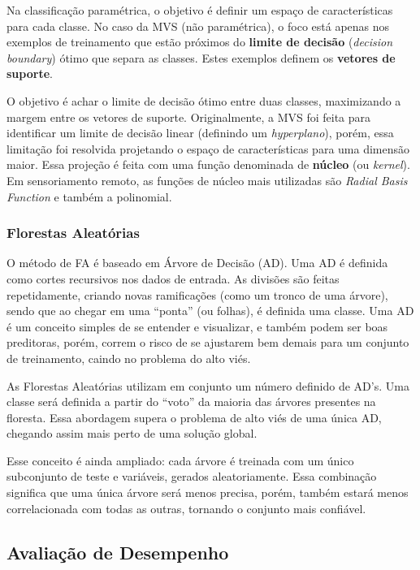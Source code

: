 Na classificação paramétrica, o objetivo é definir um espaço de
características para cada classe. No caso da MVS (não paramétrica), o
foco está apenas nos exemplos de treinamento que estão próximos do
\textbf{limite de decisão} (\emph{decision boundary}) ótimo que separa
as classes. Estes exemplos definem os \textbf{vetores de suporte}. \cite{maxwell}

O objetivo é achar o limite de decisão ótimo entre duas classes,
maximizando a margem entre os vetores de suporte. Originalmente, a MVS
foi feita para identificar um limite de decisão linear (definindo um
\emph{hyperplano}), porém, essa limitação foi resolvida projetando o
espaço de características para uma dimensão maior. Essa projeção é feita
com uma função denominada de \textbf{núcleo} (ou \emph{kernel}). Em
sensoriamento remoto, as funções de núcleo mais utilizadas são
\emph{Radial Basis Function} e também a polinomial. \cite{maxwell}

\subsubsection{Florestas Aleatórias}\label{florestas-aleatuxf3rias}

O método de FA é baseado em Árvore de Decisão (AD). Uma AD é definida
como cortes recursivos nos dados de entrada. As divisões são feitas
repetidamente, criando novas ramificações (como um tronco de uma
árvore), sendo que ao chegar em uma ``ponta'' (ou folhas), é definida
uma classe. Uma AD é um conceito simples de se entender e visualizar, e
também podem ser boas preditoras, porém, correm o risco de se ajustarem
bem demais para um conjunto de treinamento, caindo no problema do alto viés. \cite{maxwell}

As Florestas Aleatórias utilizam em conjunto um número definido de
AD's. Uma classe será definida a partir do ``voto'' da maioria das
árvores presentes na floresta. Essa abordagem supera o problema de alto
viés de uma única AD, chegando assim mais perto de uma solução global. \cite{maxwell}

Esse conceito é ainda ampliado: cada árvore é treinada com um único
subconjunto de teste e variáveis, gerados aleatoriamente. Essa
combinação significa que uma única árvore será menos precisa, porém,
também estará menos correlacionada com todas as outras, tornando o
conjunto mais confiável. \cite{maxwell}

\subsection{Avaliação de
Desempenho}\label{avaliauxe7uxe3o-de-desempenho}

